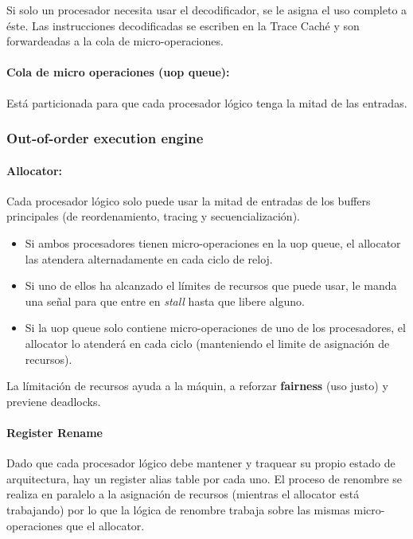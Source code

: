 Si solo un procesador necesita usar el decodificador, se le asigna el uso completo a éste. Las instrucciones decodificadas se escriben en la Trace Caché y son forwardeadas a la cola de micro-operaciones.

\paragraph{Cola de micro operaciones (uop queue):} Está particionada para que cada procesador lógico tenga la mitad de las entradas.

\subsubsection{Out-of-order execution engine}

\paragraph{Allocator:} Cada procesador lógico solo puede usar la mitad de entradas de los buffers principales (de reordenamiento, tracing y secuencialización).

\begin{itemize}
	\item Si ambos procesadores tienen micro-operaciones en la uop queue, el allocator las atendera alternadamente en cada ciclo de reloj.
	\item Si uno de ellos ha alcanzado el límites de recursos que puede usar, le manda una señal para que entre en \textit{stall} hasta que libere alguno.
	\item Si la uop queue solo contiene micro-operaciones de uno de los procesadores, el allocator lo atenderá en cada ciclo (manteniendo el limite de asignación de recursos).
\end{itemize}
 
 La límitación de recursos ayuda a la máquin, a reforzar \textbf{fairness} (uso justo) y previene deadlocks. 
 
\paragraph{Register Rename}
Dado que cada procesador lógico debe mantener y traquear su propio estado de arquitectura, hay un register alias table por cada uno. El proceso de renombre se realiza en paralelo a la asignación de recursos (mientras el allocator está trabajando) por lo que la lógica de renombre trabaja sobre las mismas micro-operaciones que el allocator.

